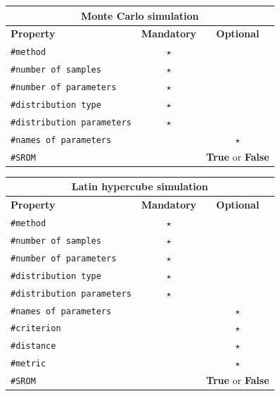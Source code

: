 \documentclass[preprint,12pt]{elsarticle}
\begin{document}
\begin{center}
	\begin{tabular}{ |l|c|c| } 
		\hline
		\multicolumn{3}{|c|}{\textbf{Monte Carlo simulation}} \\
		\hline
		\textbf{Property} & \textbf{Mandatory} & \textbf{Optional} \\
		\hline
		 \texttt{\#method}& $\star$ &   \\ 
		\hline
		\texttt{\#number of samples}& $\star$ &   \\ 
		\hline
		\texttt{\#number of parameters}& $\star$  &   \\ 
		\hline
		\texttt{\#distribution type}& $\star$ &   \\ 
		\hline
		\texttt{\#distribution parameters} & $\star$ &   \\ 
		\hline
		\texttt{\#names of parameters}& & $\star$   \\ 
		\hline
		\texttt{\#SROM}&  & \textbf{True} or \textbf{False}  \\ 
		\hline
	\end{tabular}
\end{center}

\begin{center}
	\begin{tabular}{ |l|c|c| } 
				\hline
		\multicolumn{3}{|c|}{\textbf{Latin hypercube simulation}} \\
		\hline
		\textbf{Property} & \textbf{Mandatory} & \textbf{Optional} \\
		\hline
		\texttt{\#method}& $\star$ &   \\ 
		\hline
		\texttt{\#number of samples}& $\star$ &   \\ 
		\hline
		\texttt{\#number of parameters}&  $\star$  &   \\ 
		\hline
		\texttt{\#distribution type}& $\star$ &   \\ 
		\hline
		\texttt{\#distribution parameters} & $\star$ &   \\ 
		\hline
		\texttt{\#names of parameters}& & $\star$   \\ 
		\hline
		\texttt{\#criterion}& & $\star$   \\ 
		\hline
		\texttt{\#distance}& & $\star$   \\ 
		\hline
		\texttt{\#metric}& & $\star$   \\ 
		\hline
				\texttt{\#SROM}&  & \textbf{True} or \textbf{False}    \\ 
		\hline
	\end{tabular}
\end{center}
\end{document}
